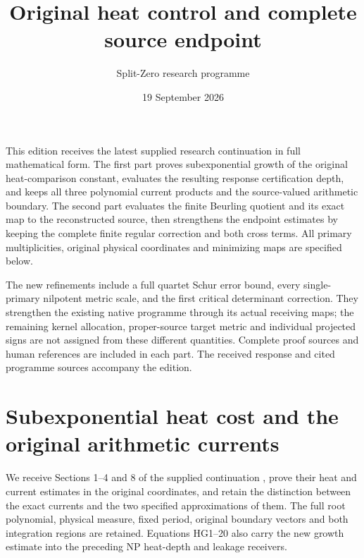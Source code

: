\documentclass[11pt]{article}
\title{Original heat control and complete source endpoint}
\author{Split-Zero research programme}\date{19 September 2026}
\begin{document}
\maketitle
This edition receives the latest supplied research continuation in full
mathematical form. The first part proves subexponential growth of the
original heat-comparison constant, evaluates the resulting response
certification depth, and keeps all three polynomial current products
and the source-valued arithmetic boundary. The second part evaluates
the finite Beurling quotient and its exact map to the reconstructed
source, then strengthens the endpoint estimates by keeping the complete
finite regular correction and both cross terms. All primary multiplicities,
original physical coordinates and minimizing maps are specified below.

The new refinements include a full quartet Schur error bound, every
single-primary nilpotent metric scale, and the first critical determinant
correction. They strengthen the existing native programme through its
actual receiving maps; the remaining kernel allocation, proper-source
target metric and individual projected signs are not assigned from these
different quantities. Complete proof sources and human references are
included in each part. The received response and cited programme sources
accompany the edition.

\begingroup
\providecommand{\C}{\mathbb C}\providecommand{\R}{\mathbb R}
\providecommand{\norm}[1]{\left\lVert#1\right\rVert}
\newtheorem{hgtheorem}{Theorem}
\newtheorem{hgproposition}{Proposition}
\newtheorem{hglemma}{Lemma}
\part*{Subexponential heat cost and the original arithmetic currents}
We receive Sections 1--4 and 8 of the supplied continuation
\cite{hg:web}, prove their heat and current estimates in the original
coordinates, and retain the distinction between the exact currents and
the two specified approximations of them. The full root polynomial,
physical measure, fixed period, original boundary vectors and both
integration regions are retained. Equations HG1--20 also carry the new
growth estimate into the preceding NP heat-depth and leakage receivers.
\end{document}
